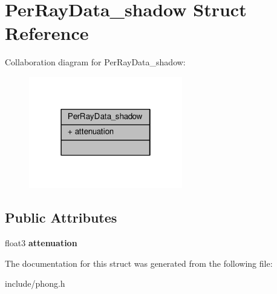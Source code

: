 \hypertarget{struct_per_ray_data__shadow}{\section{Per\-Ray\-Data\-\_\-shadow Struct Reference}
\label{struct_per_ray_data__shadow}
}


Collaboration diagram for Per\-Ray\-Data\-\_\-shadow\-:
\nopagebreak
\begin{figure}[H]
\begin{center}
\leavevmode
\includegraphics[width=190pt]{struct_per_ray_data__shadow__coll__graph}
\end{center}
\end{figure}
\subsection*{Public Attributes}
\begin{DoxyCompactItemize}
\item 
\hypertarget{struct_per_ray_data__shadow_a2d9b31f972b615d4b094bae886dc7194}{float3 {\bfseries attenuation}}\label{struct_per_ray_data__shadow_a2d9b31f972b615d4b094bae886dc7194}

\end{DoxyCompactItemize}


The documentation for this struct was generated from the following file\-:\begin{DoxyCompactItemize}
\item 
include/phong.\-h\end{DoxyCompactItemize}
